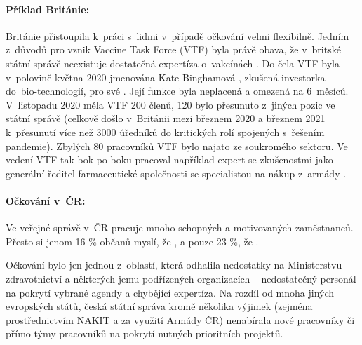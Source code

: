 \paragraph{Příklad Británie:} Británie přistoupila k~práci s~lidmi v~případě očkování velmi flexibilně. Jedním z~důvodů pro vznik Vaccine Task Force (VTF) byla právě obava, že v~britské státní správě neexistuje dostatečná expertíza o~vakcínách \cite{balls_secrets_2021}. Do čela VTF byla v~polovině května 2020 jmenována Kate Binghamová \cite{department_for_business_energy__industrial_strategy_statement_2020}, zkušená investorka do~bio-tech\-no\-lo\-gií, pro své  \cite{department_for_business_energy__industrial_strategy_statement_2020}. Její funkce byla neplacená a omezená na 6~měsíců. V~listopadu 2020 měla VTF 200 členů, 120 bylo přesunuto z~jiných pozic ve státní správě (celkově došlo v~Británii mezi březnem 2020 a březnem 2021 k~přesunutí více než 3000 úředníků do kritických rolí spojených s~řešením pandemie). Zbylých 80 pracovníků VTF bylo najato ze soukromého sektoru. Ve vedení VTF tak bok po boku pracoval například expert se zkušenostmi jako generální ředitel farmaceutické společnosti se specialistou na nákup z~armády \cite{national_audit_office_investigation_2020}.

\paragraph{Očkování v~ČR:} Ve veřejné správě v~ČR pracuje mnoho schopných a motivovaných zaměstnanců. Přesto si jenom 16 \% občanů myslí, že , a pouze 23 \%, že  \cite{aspen_vnimani_2021}.

Očkování bylo jen jednou z~oblastí, která odhalila nedostatky na Ministerstvu zdravotnictví a některých jemu podřízených organizacích -- nedostatečný personál na pokrytí vybrané agendy a chybějící expertíza. Na rozdíl od mnoha jiných evropských států, česká státní správa kromě několika výjimek (zejména prostřednictvím NAKIT a za využití Armády ČR) nenabírala nové pracovníky či přímo týmy pracovníků na pokrytí nutných prioritních projektů.

